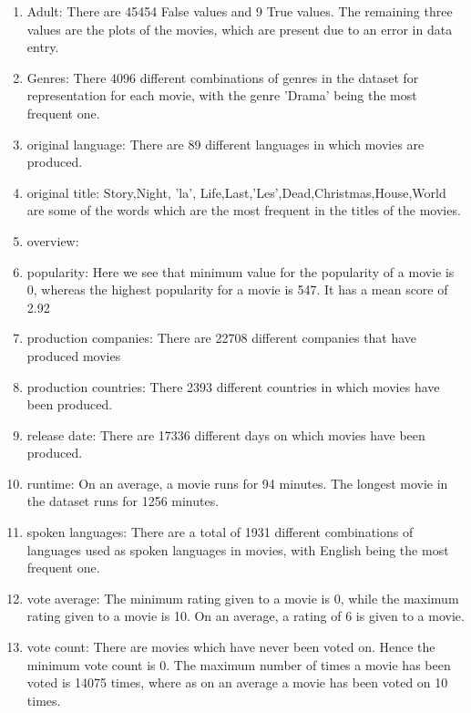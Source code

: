 \documentclass{article}
\begin{document}
\begin{enumerate}
\item Adult: There are 45454 False values and 9 True values. The remaining three values are the plots of the movies, which are present due to an error in data entry.
\item Genres: There 4096 different combinations of genres in the dataset for representation for each movie, with the genre 'Drama' being the most frequent one. 
\item original language: There are 89 different languages in which movies are produced.
\item original title: Story,Night, 'la', Life,Last,'Les',Dead,Christmas,House,World are some of the words which are the most frequent in the titles of the movies.
\item overview:
\item popularity: Here we see that minimum value for the popularity of a movie is 0, whereas the highest popularity for a movie is 547. It has a mean score of 2.92
\item production companies: There are 22708 different companies that have produced movies
\item production countries: There 2393 different countries in which movies have  been produced.
\item release date: There are 17336 different days on which movies have been produced.  
\item runtime: On an average, a movie runs for 94 minutes. The longest movie in the dataset runs for 1256 minutes.
\item spoken languages: There are a total of 1931 different combinations of languages used as spoken languages in movies, with English being the most frequent one.
\item vote average: The minimum rating given to a movie is 0, while the maximum rating given to a movie is 10. On an average, a rating of 6 is given to a movie.
\item vote count: There are movies which have never been voted on. Hence the minimum vote count is  0. The maximum number of times a movie has been voted is 14075 times, where as on an average a movie has been voted on 10 times.
\end{enumerate}
\end{document}
